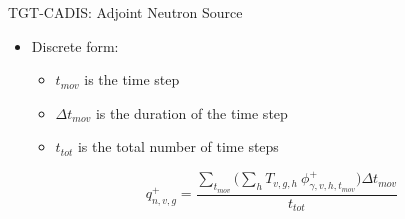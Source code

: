 \documentclass{beamer}
\begin{document}
\begin{frame}{TGT-CADIS: Adjoint Neutron Source}
	\begin{itemize}


	  \item{Discrete form:}
		  \begin{itemize}
			  \item{$t_{mov}$ is the time step}
			  \item{$\Delta t_{mov}$ is the duration of the time step}
			  \item{$t_{tot}$ is the total number of time
				  steps}
		  \end{itemize}

	    \begin{equation}\label{eq:tgt_n_src}
	    	q_{n,v,g}^{+} = \frac
	    	{\sum_{t_{mov}}\big(\sum_{h} T_{v,g,h} \
	    	\phi_{\gamma,v,h,t_{mov}}^{+}\big) \Delta t_{mov}}
	    	{t_{tot}}
	    \end{equation}
	\end{itemize}


\end{frame}
\end{document}
